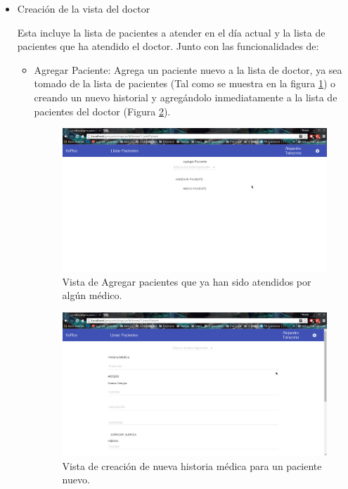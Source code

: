 \begin{enumerate}
\begin{itemize}
            \item Creación de la vista del doctor
            
            Esta incluye la lista de pacientes a atender en el día actual y la lista de pacientes que ha atendido el doctor. Junto con las funcionalidades de:
            
            \begin{itemize}
                \item Agregar Paciente: Agrega un paciente nuevo a la lista de doctor, ya sea tomado de la lista de pacientes (Tal como se muestra en la figura \ref{Agregar}) o creando un nuevo historial y agregándolo inmediatamente a la lista de pacientes del doctor (Figura \ref{creación}).
                
                \begin{figure}[htbp!]
                    \begin{center}
                        \includegraphics[width=.8\textwidth]{figures/p8}
                    \end{center}
                    \caption{Vista de Agregar pacientes que ya han sido atendidos por algún médico.}
                    \label{Agregar}
                \end{figure}
                
                \begin{figure}[htbp!]
                    \begin{center}
                        \includegraphics[width=.8\textwidth]{figures/p10}
                    \end{center}
                    \caption{Vista de creación de nueva historia médica para un paciente nuevo.}
                    \label{creación}
                \end{figure}
                

\end{itemize}
\end{itemize}
\end{enumerate}
